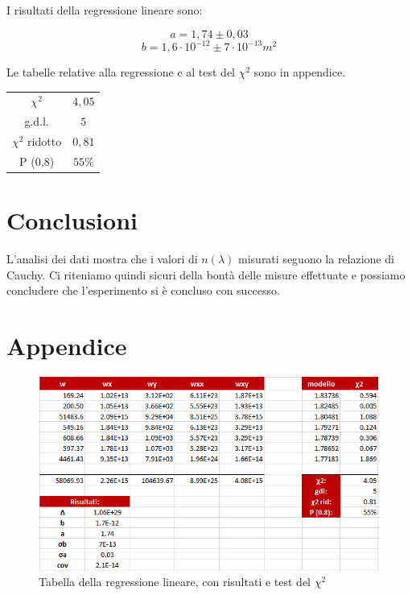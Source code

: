 \documentclass{article}
\begin{document}
I risultati della regressione lineare sono:

\[a=1,74 \pm 0,03\]
\[b=1,6 \cdot 10^{-12} \pm 7 \cdot 10^{-13} m^2\]

Le tabelle relative alla regressione e al test del $\chi ^2$ sono in appendice.

\begin{center}
\begin{tabular}{ | c | c |  }
  \hline
  $\chi ^2$ & $4,05$\\
  g.d.l. & $5$\\
  $\chi ^2$ ridotto & $0,81$\\
  \hline
  P (0,8) & $55 \%$\\
  \hline
\end{tabular}
\end{center}

\section{Conclusioni}
L'analisi dei dati mostra che i valori di $n(\lambda)$ misurati seguono la relazione di Cauchy. Ci riteniamo quindi sicuri della bontà delle misure effettuate e possiamo concludere che l'esperimento si è concluso con successo.

\section{Appendice}

\begin{figure}[h!]
  \centering
  \includegraphics[width=\linewidth]{Prisma_app}
  \caption{Tabella della regressione lineare, con risultati e test del $\chi ^2$}
\end{figure}
\end{document}
